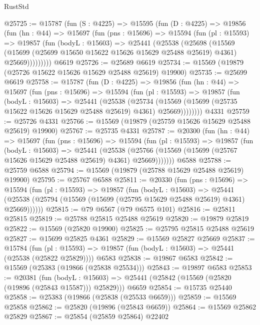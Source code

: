 \begin{lexlean}{RustStd}
\begin{coremodule}
@25725 := @15787
    (fun (S : @4225) =>
    @15595
      (fun (D : @4225) =>
      @19856
        (fun (hn : @44) =>
        @15697
          (fun (pns : @15696) =>
          @15594
            (fun (pl : @15593) =>
            @19857
              (fun (bodyL : @15603) =>
              @25441
                (@25538
                  (@25698
                    (@15569
                      (@15699 (@25699 @15650 @15622 @15626 @15629 @25488 @25619) @4361)
                      @25669)))))))))
    @6619
@25726 := @25689 @6619
@25734 := @15569 (@19879 (@25726 @15622 @15626 @15629 @25488 @25619) @19900)
@25735 := @25699 @6619
@25758 := @15787
    (fun (D : @4225) =>
    @19856
      (fun (hn : @44) =>
      @15697
        (fun (pns : @15696) =>
        @15594
          (fun (pl : @15593) =>
          @19857
            (fun (bodyL : @15603) =>
            @25441
              (@25538
                (@25734
                  (@15569 (@15699 (@25735 @15622 @15626 @15629 @25488 @25619) @4361) @25669))))))))
    @4331
@25759 := @25726 @4331
@25766 := @15569 (@19879 (@25759 @15626 @15629 @25488 @25619) @19900)
@25767 := @25735 @4331
@25787 := @20300
    (fun (hn : @44) =>
    @15697
      (fun (pns : @15696) =>
      @15594
        (fun (pl : @15593) =>
        @19857
          (fun (bodyL : @15603) =>
          @25441
            (@25538
              (@25766 (@15569 (@15699 (@25767 @15626 @15629 @25488 @25619) @4361) @25669)))))))
    @6588
@25788 := @25759 @6588
@25794 := @15569 (@19879 (@25788 @15629 @25488 @25619) @19900)
@25795 := @25767 @6588
@25811 := @20330
    (fun (pns : @15696) =>
    @15594
      (fun (pl : @15593) =>
      @19857
        (fun (bodyL : @15603) =>
        @25441 (@25538 (@25794 (@15569 (@15699 (@25795 @15629 @25488 @25619) @4361) @25669))))))
@25815 := @79 @6567 (@79 @6575 @101)
@25816 := @25811 @25815
@25819 := @25788 @25815 @25488 @25619
@25820 := @19879 @25819
@25822 := @15569 (@25820 @19900)
@25825 := @25795 @25815 @25488 @25619
@25827 := @15699 @25825 @4361
@25829 := @15569 @25827 @25669
@25837 := @15784
    (fun (pl : @15593) => @19857 (fun (bodyL : @15603) => @25441 (@25538 (@25822 @25829))))
    @6583
@25838 := @19867 @6583
@25842 := @15569 (@25383 (@19866 (@25838 @25534)))
@25843 := @19897 @6583
@25853 := @20381
    (fun (bodyL : @15603) => @25441 (@25842 (@15569 (@25820 (@19896 (@25843 @15587))) @25829)))
    @6659
@25854 := @15735 @25440
@25858 := @25383 (@19866 (@25838 (@25533 @6659)))
@25859 := @15569 @25858
@25862 := @25820 (@19896 (@25843 @6659))
@25864 := @15569 @25862 @25829
@25867 := @25854 (@25859 @25864) @22402

\end{coremodule}
\end{lexlean}
